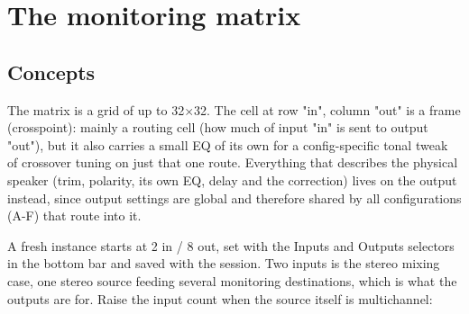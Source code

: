 \chapter{The monitoring matrix}\label{ch:matrix}


\section{Concepts}
The matrix is a grid of up to 32$\times$32. The cell at row "in", column "out" is a frame (crosspoint): mainly a routing cell (how much of input "in" is sent to output "out"), but it also
carries a small EQ of its own for a config-specific tonal tweak of crossover tuning on just that one route. Everything that describes the physical speaker (trim, polarity, its own EQ, delay and the  correction) lives on the output instead, since output settings are global and therefore shared by all configurations (A-F) that route into it.

A fresh instance starts at 2 in / 8 out, set with the Inputs and Outputs selectors in the bottom bar and saved with the session. Two inputs is the stereo mixing case, one stereo source feeding several monitoring destinations, which is what the outputs are for. Raise the input count when the source itself is multichannel:

